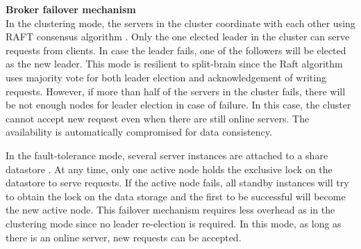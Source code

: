 \textbf{Broker failover mechanism}\\
In the clustering mode, the servers in the cluster coordinate with each other using RAFT consensus algorithm \cite{raftalg}. Only the one elected leader in the cluster can serve requests from clients. In case the leader fails, one of the followers will be elected as the new leader. This mode is resilient to split-brain since the Raft algorithm uses majority vote for both leader election and acknowledgement of writing requests. However, if more than half of the servers in the cluster fails, there will be not enough nodes for leader election in case of failure. In this case, the cluster cannot accept new request even when there are still online servers. The availability is automatically compromised for data consistency. 

In the fault-tolerance mode, several server instances are attached to a share datastore \cite{natsstreaming}. At any time, only one active node holds the exclusive lock on the datastore to serve requests. If the active node fails, all standby instances will try to obtain the lock on the data storage and the first to be successful will become the new active node. This failover mechanism requires less overhead as in the clustering mode since no leader re-election is required. In this mode, as long as there is an online server, new requests can be accepted.